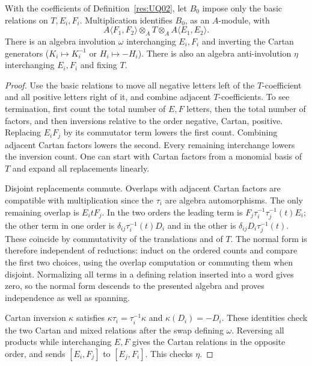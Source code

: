 \begin{lemma}
\label{res:UQ03}
With the coefficients of Definition~\ref{res:UQ02},
let \(B_0\) impose only the basic relations on \(T,E_i,F_i\).
Multiplication identifies \(B_0\), as an \(A\)-module, with
\[
 A\langle F_1,F_2\rangle\otimes_A T
       \otimes_A A\langle E_1,E_2\rangle .
\]
There is an algebra involution \(\omega\) interchanging
\(E_i,F_i\) and inverting the Cartan generators
(\(K_i\mapsto K_i^{-1}\) or \(H_i\mapsto-H_i\)).
There is also an algebra anti-involution \(\eta\) interchanging
\(E_i,F_i\) and fixing \(T\).
\end{lemma}
\begin{proof}
Use the basic relations to move all negative letters left of
the \(T\)-coefficient and all positive letters right of it,
and combine adjacent \(T\)-coefficients. To see termination,
first count the total number of \(E,F\) letters, then the
total number of factors, and then inversions relative to the
order negative, Cartan, positive. Replacing \(E_iF_j\) by its
commutator term lowers the first count. Combining adjacent
Cartan factors lowers the second. Every remaining interchange
lowers the inversion count. One can start with Cartan factors
from a monomial basis of \(T\) and expand all replacements
linearly.

Disjoint replacements commute. Overlaps with adjacent
Cartan factors are compatible with multiplication since the
\(\tau_i\) are algebra automorphisms. The only remaining
overlap is \(E_i tF_j\). In the two orders the leading term
is \(F_j\tau_i^{-1}\tau_j^{-1}(t)E_i\); the other term in
one order is \(\delta_{ij}\tau_i^{-1}(t)D_i\) and in
the other is \(\delta_{ij}D_i\tau_j^{-1}(t)\).
These coincide by commutativity of the translations and
of \(T\). The normal form is therefore independent of reductions:
induct on the ordered counts and compare the first two choices,
using the overlap computation or commuting them when disjoint.
Normalizing all terms in a defining relation inserted into
a word gives zero, so the normal form descends to the
presented algebra and proves independence as well as spanning.

Cartan inversion \(\kappa\) satisfies
\(\kappa\tau_i=\tau_i^{-1}\kappa\) and \(\kappa(D_i)=-D_i\).
These identities check the two Cartan and mixed relations
after the swap defining \(\omega\). Reversing all products
while interchanging \(E,F\) gives the Cartan relations in
the opposite order, and sends
\([E_i,F_j]\) to \([E_j,F_i]\). This checks \(\eta\).
\end{proof}

